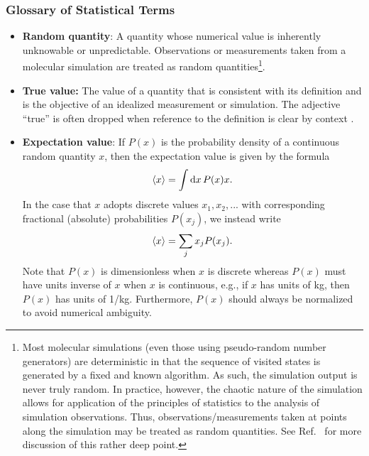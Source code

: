 \subsubsection{Glossary of Statistical Terms}
\begin{itemize}

\item {\bf Random quantity}: A quantity whose numerical value is inherently unknowable or unpredictable.
  Observations or measurements taken from a molecular simulation are treated as random quantities\footnote{Most molecular simulations (even those using pseudo-random number generators) are deterministic in that the sequence of visited states is generated by a fixed and known algorithm.  As such, the simulation output is never truly random.
In practice, however, the chaotic nature of the simulation allows for application of the principles of statistics to the analysis of simulation observations.
Thus, observations/measurements taken at points along the simulation may be treated as random quantities.
See Ref.~\cite{Leimkuhler} for more discussion of this rather deep point.}.

\item {\bf True value:}  The value of a quantity that is consistent with its definition and is the objective of an idealized measurement or simulation. The adjective ``true'' is often dropped when reference to the definition is clear by context \citep{JCGM:GUM2008,JCGM:VIM2012}.
  \label{def:true_value}

\item {\bf Expectation value}:  If $P(x)$ is the probability density of a continuous random quantity $x$, then the expectation value is given by the formula
\begin{align}
  \langle x \rangle = \int {\rm d}x\, P(x) x.
\end{align}
In the case that $x$ adopts discrete values $x_1,x_2,...$ with corresponding fractional (absolute) probabilities $P(x_j)$, we instead write
\begin{align}
  \langle x \rangle = \sum_j x_j P(x_j).
\end{align}
Note that $P(x)$ is dimensionless when $x$ is discrete whereas $P(x)$ must have units inverse of $x$ when $x$ is continuous, e.g., if $x$ has units of kg, then $P(x)$ has units of 1/kg. Furthermore, $P(x)$ should always be normalized to avoid numerical ambiguity.


\end{itemize}
